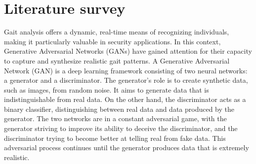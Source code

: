 \documentclass[12pt,a4paper]{article}
\begin{document}

\section{Literature survey}
Gait analysis offers a dynamic, real-time means of recognizing individuals, making it particularly valuable in security applications. In this context, Generative Adversarial Networks (GANs) have gained attention for their capacity to capture and synthesize realistic gait patterns. A Generative Adversarial Network (GAN) is a deep learning framework consisting of two neural networks: a generator and a discriminator. The generator's role is to create synthetic data, such as images, from random noise. It aims to generate data that is indistinguishable from real data. On the other hand, the discriminator acts as a binary classifier, distinguishing between real data and data produced by the generator. The two networks are in a constant adversarial game, with the generator striving to improve its ability to deceive the discriminator, and the discriminator trying to become better at telling real from fake data. This adversarial process continues until the generator produces data that is extremely realistic.

\end{document}
